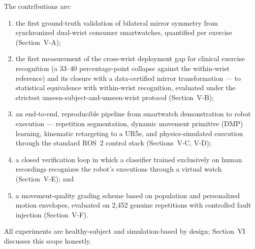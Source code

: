 \documentclass[conference]{IEEEtran}
\begin{document}
The contributions are:
\begin{enumerate}
\item the first ground-truth validation of bilateral mirror symmetry
from synchronized dual-wrist consumer smartwatches, quantified per
exercise (Section~V-A);
\item the first measurement of the cross-wrist deployment gap for
clinical exercise recognition (a 33--40 percentage-point collapse
against the within-wrist reference) and
its closure with a data-certified mirror transformation --- to
statistical equivalence with within-wrist recognition, evaluated under
the strictest unseen-subject-and-unseen-wrist protocol
(Section~V-B);
\item an end-to-end, reproducible pipeline from smartwatch
demonstration to robot execution --- repetition segmentation, dynamic
movement primitive (DMP) learning, kinematic retargeting to a UR5e,
and physics-simulated execution through the standard ROS~2 control
stack (Sections~V-C, V-D);
\item a closed verification loop in which a classifier trained
exclusively on human recordings recognizes the robot's executions
through a virtual watch (Section~V-E); and
\item a movement-quality grading scheme based on population and
personalized motion envelopes, evaluated on 2{,}452 genuine
repetitions with controlled fault injection (Section~V-F).
\end{enumerate}

All experiments are healthy-subject and simulation-based by design;
Section~VI discusses this scope honestly.
\end{document}
